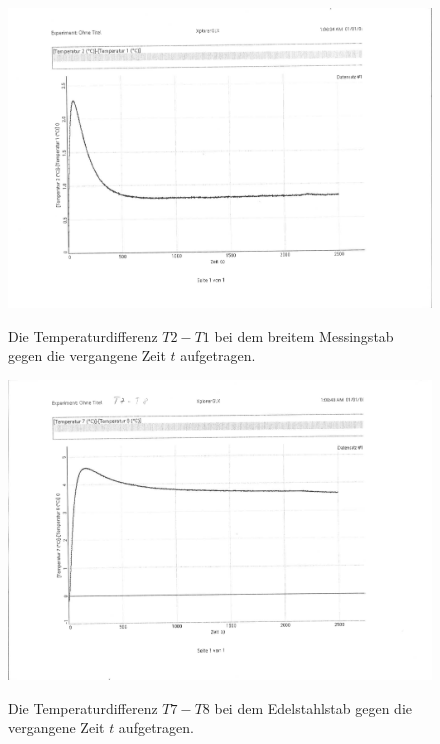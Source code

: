\begin{figure}
	\centering
	\caption{Die Temperaturdifferenz $T2-T1$ bei dem breitem Messingstab gegen die vergangene Zeit $t$ aufgetragen.}
	\includegraphics[width=\linewidth-70pt,height=\textheight-70pt,keepaspectratio]{content/Bilder/T2-T1-rotated.pdf}
	\label{fig:Graph3}
\end{figure}
\begin{table}
	\centering
	\caption{Der nach Formel \eqref{eq:form1} berechnete Wärmestrom $\frac{\Delta Q_{21}}{\Delta t}$ nach der Zeit $t$ und die aus \ref{fig:Graph3} entnommene Temperaturdifferenz $T2-T1$ bei dem breitem Messingstab.}
	
\end{table}
\begin{figure}
	\centering
	\caption{Die Temperaturdifferenz $T7-T8$ bei dem Edelstahlstab gegen die vergangene Zeit $t$ aufgetragen.}
	\includegraphics[width=\linewidth-70pt,height=\textheight-70pt,keepaspectratio]{content/Bilder/T7-T8-rotated.pdf}
	\label{fig:Graph4}
\end{figure}
